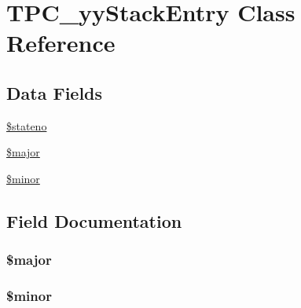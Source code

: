\hypertarget{class_t_p_c__yy_stack_entry}{}\section{T\+P\+C\+\_\+yy\+Stack\+Entry Class Reference}
\label{class_t_p_c__yy_stack_entry}
\subsection*{Data Fields}
\begin{DoxyCompactItemize}
\item 
\hyperlink{class_t_p_c__yy_stack_entry_aebe2d8de0440725d5783d4447a8548d4}{\$stateno}
\item 
\hyperlink{class_t_p_c__yy_stack_entry_af144df62b50cc25e0fdcc5bb80e30360}{\$major}
\item 
\hyperlink{class_t_p_c__yy_stack_entry_ada7edccfef7601184431347519c2ff53}{\$minor}
\end{DoxyCompactItemize}


\subsection{Field Documentation}
\hypertarget{class_t_p_c__yy_stack_entry_af144df62b50cc25e0fdcc5bb80e30360}{}
\subsubsection[{\$major}]{\setlength{\rightskip}{0pt plus 5cm}\$major}\label{class_t_p_c__yy_stack_entry_af144df62b50cc25e0fdcc5bb80e30360}
\hypertarget{class_t_p_c__yy_stack_entry_ada7edccfef7601184431347519c2ff53}{}
\subsubsection[{\$minor}]{\setlength{\rightskip}{0pt plus 5cm}\$minor}\label{class_t_p_c__yy_stack_entry_ada7edccfef7601184431347519c2ff53}
\hypertarget{class_t_p_c__yy_stack_entry_aebe2d8de0440725d5783d4447a8548d4}{}
